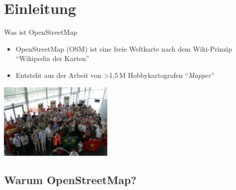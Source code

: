 \documentclass{beamer}
\begin{document}
\section{Einleitung}

\begin{frame}{Was ist OpenStreetMap}

\begin{itemize}
  \item OpenStreetMap (OSM) ist eine freie Weltkarte nach dem Wiki-Prinzip "`Wikipedia der Karten"'
\pause
  \item Entsteht aus der Arbeit von \textgreater 1,5\,M Hobbykartografen "`\emph{Mapper}"'
\end{itemize}

 \begin{center}
 \includegraphics[width=5.5cm]{sotm.jpg}
 \end{center}

\end{frame}

\subsection{Warum OpenStreetMap?}
\end{document}
